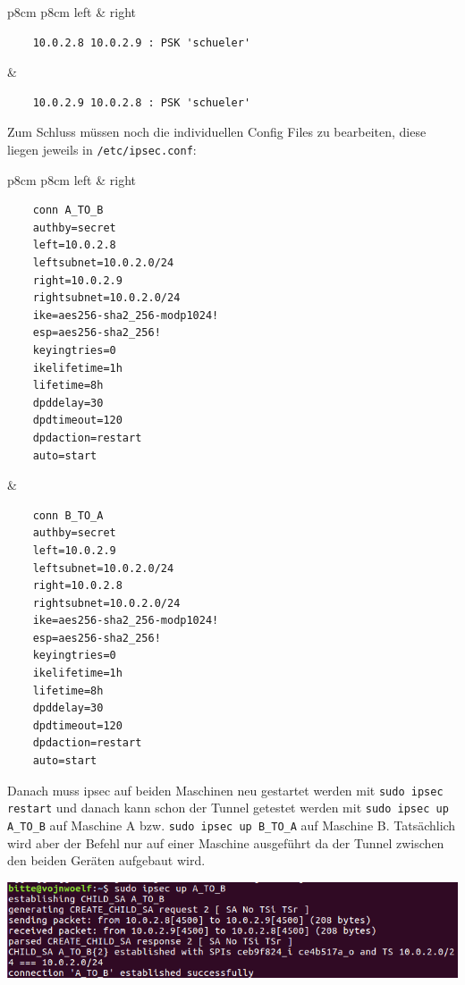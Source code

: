 \begin{tabular}{p{8cm} p{8cm}}
	left  &   right\\
	\begin{lstlisting}
	10.0.2.8 10.0.2.9 : PSK 'schueler'
	\end{lstlisting}&
	\begin{lstlisting}
	10.0.2.9 10.0.2.8 : PSK 'schueler'
	\end{lstlisting}
\end{tabular} 




Zum Schluss müssen noch die individuellen Config Files zu bearbeiten, diese liegen jeweils in \verb|/etc/ipsec.conf|:

\begin{tabular}{p{8cm} p{8cm}}
	left  &   right\\
	\begin{lstlisting}
	conn A_TO_B
	authby=secret
	left=10.0.2.8
	leftsubnet=10.0.2.0/24
	right=10.0.2.9
	rightsubnet=10.0.2.0/24
	ike=aes256-sha2_256-modp1024!
	esp=aes256-sha2_256!
	keyingtries=0
	ikelifetime=1h
	lifetime=8h
	dpddelay=30
	dpdtimeout=120
	dpdaction=restart
	auto=start
	\end{lstlisting}&
	\begin{lstlisting}
	conn B_TO_A
	authby=secret
	left=10.0.2.9
	leftsubnet=10.0.2.0/24
	right=10.0.2.8
	rightsubnet=10.0.2.0/24
	ike=aes256-sha2_256-modp1024!
	esp=aes256-sha2_256!
	keyingtries=0
	ikelifetime=1h
	lifetime=8h
	dpddelay=30
	dpdtimeout=120
	dpdaction=restart
	auto=start
	\end{lstlisting}
\end{tabular} 

Danach muss ipsec auf beiden Maschinen neu gestartet werden mit \verb|sudo ipsec restart| und danach kann schon der Tunnel getestet werden mit \verb|sudo ipsec up A_TO_B| auf Maschine A bzw. \verb|sudo ipsec up B_TO_A| auf Maschine B. Tatsächlich wird aber der Befehl nur auf einer Maschine ausgeführt da der Tunnel zwischen den beiden Geräten aufgebaut wird.

\begin{minipage}{\linewidth}
	\centering
	\includegraphics[width=0.8\linewidth]{images/left}
\end{minipage}


